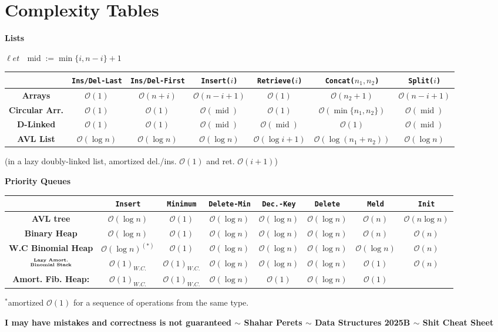\documentclass[]{article}
\newcommand\compactsection   [1]        {\vspace{-10pt}\section{#1}\vspace{-5pt}}
\theoremstyle{definition}
\newcommand\oc    {\mathcal{O}}
\newcommand\set   {\ell et \text{ }}
\newcommand\logn      {\log n}
\newcommand\regFont   {\fontsize{5}{6}\rmfamily}
\newcommand\tableFont {\fontsize{5}{4}\rmfamily}
\DeclareMathOperator{\midText}{mid}
\begin{document}
	\vspace{-7pt}
	\compactsection{Complexity Tables}
	\vspace{-15pt}
	\begin{multicols}{2}
		{\regFont\hfil \textbf{Lists}}\tableFont
		
		{\hfil $\set \midText := \min\{i, n - i\} + 1$}
		\begin{center}
			\begin{tabular}{c|c|c|c|c|c|c}
				& \texttt{Ins/Del-Last} & \texttt{Ins/Del-First} & \texttt{Insert($i$)} & \texttt{Retrieve($i$)} &
				\texttt{Concat($n_1, n_2$)} & \texttt{Split($i$)} \\
				\hline
				\textbf{Arrays} & $\oc(1)$ & $\oc(n + i)$ & $\oc(n - i + 1)$ & $\oc(1)$  & $\oc(n_2 + 1)$ & $\oc(n - i + 1)$ \\
				\textbf{Circular Arr.} & $\oc(1)$ & $\oc(1)$ & $\oc(\midText)$ & $\oc(1)$ & $\oc(\min\{n_1, n_2\})$ & $\oc(\midText)$ \\ 
				\textbf{D-Linked} & $\oc(1)$ & $\oc(1)$ & $\oc(\midText)$ & $\oc(\midText)$ & $\oc(1)$ & $\oc(\midText)$ \\ 
				\textbf{AVL List} & $\oc(\logn)$ & $\oc(\logn)$ & $\oc(\logn)$ &$\oc(\log i + 1)$ & $\oc(\log(n_1 + n_2))$ & $\oc(\logn)$
			\end{tabular}
		\end{center}
		(in a lazy doubly-linked list, amortized del./ins. $\oc(1)$ and ret. $\oc(i + 1)$)
		
		\columnbreak
		{\regFont\hfil \textbf{Priority Queues}}\tableFont 
		\begin{center}\begin{tabular}{c|c|c|c|c|c|c|c}
				& \textbf{\texttt{Insert}} & \textbf{\texttt{Minimum}} & \textbf{\texttt{Delete-Min}} & \textbf{\texttt{Dec.-Key}} & \textbf{\texttt{Delete}} & \textbf{\texttt{Meld}} & \textbf{\texttt{Init}} \\
				\hline
				\textbf{AVL tree} & $\oc(\logn) $ & $\oc(1)$ & $\oc(\logn)$ & $\oc(\logn)$ & $\oc(\logn)$ & $\oc(n)$ & $\oc(n \logn)$ \\
				\textbf{Binary Heap} & $\oc(\logn)$ & $\oc(1)$ & $\oc(\logn)$ & $\oc(\logn)$ & $\oc(\logn)$ & $\oc(n)$ & $\oc(n)$ \\
				\textbf{W.C Binomial Heap} & $\oc(\logn)^{(*)}$ & $\oc(1)$ & $\oc(\logn)$ & $\oc(\logn)$ & $\oc(\logn)$ & $\oc(\logn)$ & $\oc(n)$ \\
				$\overset{\text{\tableFont \textbf{Lazy Amort.}}}{\text{\tableFont \textbf{Binomial Stack}}}$
				& $\oc(1)_{W.C.}$ & $ \oc(1)_{W.C.} $ & $\oc(\logn)$ & $\oc(\logn)$ & $\oc(\logn)$ & $\oc(1)$ & $\oc(n)$ \\
				\textbf{Amort. Fib. Heap: }& $\oc(1)_{W.C.}$ & $ \oc(1)_{W.C.} $ & $\oc(\logn)$ & $\oc(1)$ & $\oc(\logn)$ & $\oc(1)$ & \\
			\end{tabular}\end{center}
			$^{*}$amortized $\oc(1)$ for a sequence of operations from the same type. 
	\end{multicols}
	\vspace{-20pt}
	\textbf{I may have mistakes and correctness is not guaranteed $\sim$ Shahar Perets $\sim$ Data Structures 2025B $\sim$ Shit Cheat Sheet}
	
\end{document}
